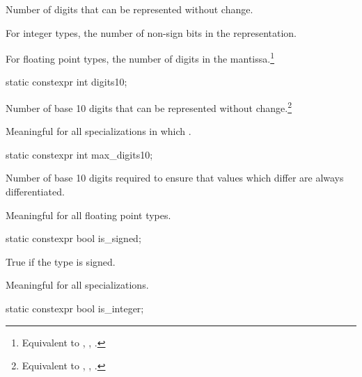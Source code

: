 \begin{itemdescr}
\pnum
Number of
digits that can be represented without change.

\pnum
For integer types, the number of non-sign bits in the representation.

\pnum For floating point types, the number of  digits in the
mantissa.\footnote{Equivalent to , ,
.} \end{itemdescr}

\begin{itemdecl}
static constexpr int digits10;
\end{itemdecl}

\begin{itemdescr}
\pnum
Number of base 10 digits that can be represented without
change.\footnote{Equivalent to , ,
.}

\pnum
Meaningful for all specializations in which
.
\end{itemdescr}

\begin{itemdecl}
static constexpr int max_digits10;
\end{itemdecl}

\begin{itemdescr}
\pnum
Number of base 10 digits required to ensure that values which
differ are always differentiated.

\pnum
Meaningful for all floating point types.
\end{itemdescr}

\begin{itemdecl}
static constexpr bool is_signed;
\end{itemdecl}

\begin{itemdescr}
\pnum
True if the type is signed.

\pnum
Meaningful for all specializations.
\end{itemdescr}

\begin{itemdecl}
static constexpr bool is_integer;
\end{itemdecl}

